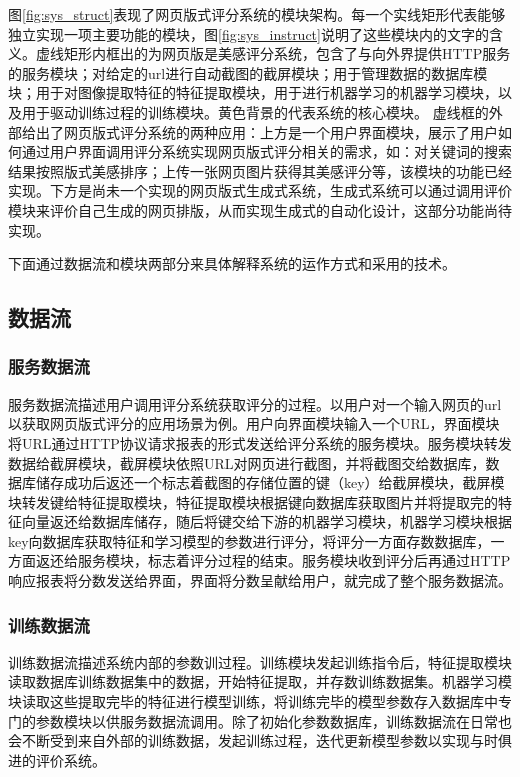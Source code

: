 图\ref{fig:sys_struct}表现了网页版式评分系统的模块架构。每一个实线矩形代表能够独立实现一项主要功能的模块，图\ref{fig:sys_instruct}说明了这些模块内的文字的含义。虚线矩形内框出的为网页版是美感评分系统，包含了与向外界提供HTTP服务的服务模块；对给定的url进行自动截图的截屏模块；用于管理数据的数据库模块；用于对图像提取特征的特征提取模块，用于进行机器学习的机器学习模块，以及用于驱动训练过程的训练模块。黄色背景的代表系统的核心模块。
虚线框的外部给出了网页版式评分系统的两种应用：上方是一个用户界面模块，展示了用户如何通过用户界面调用评分系统实现网页版式评分相关的需求，如：对关键词的搜索结果按照版式美感排序；上传一张网页图片获得其美感评分等，该模块的功能已经实现。下方是尚未一个实现的网页版式生成式系统，生成式系统可以通过调用评价模块来评价自己生成的网页排版，从而实现生成式的自动化设计，这部分功能尚待实现。

下面通过数据流和模块两部分来具体解释系统的运作方式和采用的技术。

\subsection{数据流}

\subsubsection{服务数据流}
服务数据流描述用户调用评分系统获取评分的过程。以用户对一个输入网页的url以获取网页版式评分的应用场景为例。用户向界面模块输入一个URL，界面模块将URL通过HTTP协议请求报表的形式发送给评分系统的服务模块。服务模块转发数据给截屏模块，截屏模块依照URL对网页进行截图，并将截图交给数据库，数据库储存成功后返还一个标志着截图的存储位置的键（key）给截屏模块，截屏模块转发键给特征提取模块，特征提取模块根据键向数据库获取图片并将提取完的特征向量返还给数据库储存，随后将键交给下游的机器学习模块，机器学习模块根据key向数据库获取特征和学习模型的参数进行评分，将评分一方面存数数据库，一方面返还给服务模块，标志着评分过程的结束。服务模块收到评分后再通过HTTP响应报表将分数发送给界面，界面将分数呈献给用户，就完成了整个服务数据流。

\subsubsection{训练数据流}
训练数据流描述系统内部的参数训过程。训练模块发起训练指令后，特征提取模块读取数据库训练数据集中的数据，开始特征提取，并存数训练数据集。机器学习模块读取这些提取完毕的特征进行模型训练，将训练完毕的模型参数存入数据库中专门的参数模块以供服务数据流调用。除了初始化参数数据库，训练数据流在日常也会不断受到来自外部的训练数据，发起训练过程，迭代更新模型参数以实现与时俱进的评价系统。

